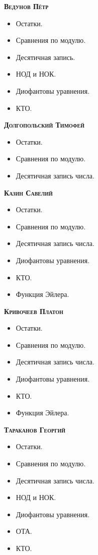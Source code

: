 \documentclass[12pt]{article}
\begin{document}
    \textbf{\textsc{Ведунов Пётр}}
    \begin{itemize}
        \item Остатки.
        \item Сравнения по модулю.
        \item Десятичная запись.
        \item НОД и НОК.
        \item Диофантовы уравнения.
        \item КТО.
    \end{itemize}
    \textbf{\textsc{Долгопольский Тимофей}}
    \begin{itemize}
        \item Остатки.
        \item Сравнения по модулю.
        \item Десятичная запись числа.
    \end{itemize}
    \textbf{\textsc{Казин Савелий}}
    \begin{itemize}
        \item Остатки.
        \item Сравнения по модулю.
        \item Десятичная запись числа.
        \item Диофантовы уравнения.
        \item КТО.
        \item Функция Эйлера.
    \end{itemize}
    \textbf{\textsc{Кривочеев Платон}}
    \begin{itemize}
        \item Остатки.
        \item Сравнения по модулю.
        \item Десятичная запись числа.
        \item Диофантовы уравнения.
        \item КТО.
        \item Функция Эйлера.
    \end{itemize}
    \textbf{\textsc{Тараканов Георгий}}
    \begin{itemize}
        \item Остатки.
        \item Сравнения по модулю.
        \item Десятичная запись числа.
        \item НОД и НОК.
        \item Диофантовы уравнения.
        \item ОТА.
        \item КТО.
    \end{itemize}
\end{document}
